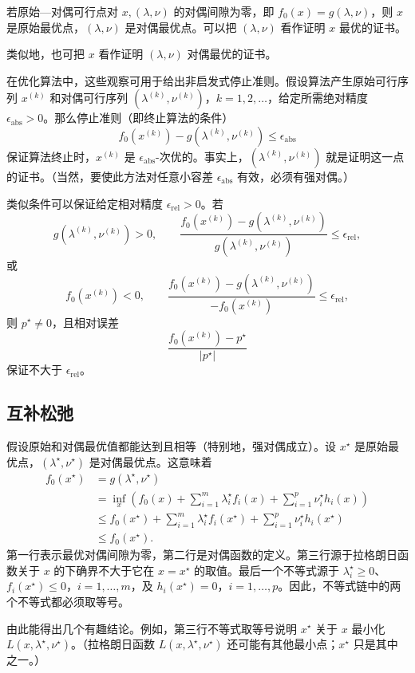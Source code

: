 若原始—对偶可行点对 $x,(\lambda,\nu)$ 的对偶间隙为零，即 $f_0(x)=g(\lambda,\nu)$，则 $x$ 是原始最优点，$(\lambda,\nu)$ 是对偶最优点。可以把 $(\lambda,\nu)$ 看作证明 $x$ 最优的证书。

类似地，也可把 $x$ 看作证明 $(\lambda,\nu)$ 对偶最优的证书。

在优化算法中，这些观察可用于给出非启发式停止准则。假设算法产生原始可行序列 $x^{(k)}$ 和对偶可行序列 $(\lambda^{(k)},\nu^{(k)})$，$k=1,2,\ldots$，给定所需绝对精度 $\epsilon_{\mathrm{abs}}>0$。那么停止准则（即终止算法的条件）
\[
f_0(x^{(k)})-g(\lambda^{(k)},\nu^{(k)})\le\epsilon_{\mathrm{abs}}
\]
保证算法终止时，$x^{(k)}$ 是 $\epsilon_{\mathrm{abs}}$-次优的。事实上，$(\lambda^{(k)},\nu^{(k)})$ 就是证明这一点的证书。（当然，要使此方法对任意小容差 $\epsilon_{\mathrm{abs}}$ 有效，必须有强对偶。）

类似条件可以保证给定相对精度 $\epsilon_{\mathrm{rel}}>0$。若
\[
g(\lambda^{(k)},\nu^{(k)})>0,\qquad
\frac{f_0(x^{(k)})-g(\lambda^{(k)},\nu^{(k)})}
{g(\lambda^{(k)},\nu^{(k)})}\le\epsilon_{\mathrm{rel}},
\]
或
\[
f_0(x^{(k)})<0,\qquad
\frac{f_0(x^{(k)})-g(\lambda^{(k)},\nu^{(k)})}
{-f_0(x^{(k)})}\le\epsilon_{\mathrm{rel}},
\]
则 $p^\star\ne0$，且相对误差
\[
\frac{f_0(x^{(k)})-p^\star}{|p^\star|}
\]
保证不大于 $\epsilon_{\mathrm{rel}}$。

\subsection{互补松弛}
假设原始和对偶最优值都能达到且相等（特别地，强对偶成立）。设 $x^\star$ 是原始最优点，$(\lambda^\star,\nu^\star)$ 是对偶最优点。这意味着
\[
\begin{aligned}
f_0(x^\star)&=g(\lambda^\star,\nu^\star)\\
&=\inf_x\left(f_0(x)+\sum_{i=1}^m\lambda_i^\star f_i(x)
+\sum_{i=1}^p\nu_i^\star h_i(x)\right)\\
&\le f_0(x^\star)+\sum_{i=1}^m\lambda_i^\star f_i(x^\star)
+\sum_{i=1}^p\nu_i^\star h_i(x^\star)\\
&\le f_0(x^\star).
\end{aligned}
\]
第一行表示最优对偶间隙为零，第二行是对偶函数的定义。第三行源于拉格朗日函数关于 $x$ 的下确界不大于它在 $x=x^\star$ 的取值。最后一个不等式源于 $\lambda_i^\star\ge0$、$f_i(x^\star)\le0$，$i=1,\ldots,m$，及 $h_i(x^\star)=0$，$i=1,\ldots,p$。因此，不等式链中的两个不等式都必须取等号。

由此能得出几个有趣结论。例如，第三行不等式取等号说明 $x^\star$ 关于 $x$ 最小化 $L(x,\lambda^\star,\nu^\star)$。（拉格朗日函数 $L(x,\lambda^\star,\nu^\star)$ 还可能有其他最小点；$x^\star$ 只是其中之一。）

